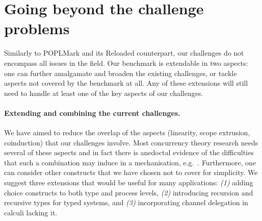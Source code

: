 \documentclass[runningheads]{llncs}
\begin{document}
\section{Going beyond the challenge problems}\label{sec:going-beyond}
Similarly to POPLMark and its Reloaded counterpart, our challenges do not encompass all issues in the field.
Our benchmark is extendable in two aspects: one can further amalgamate and broaden the existing challenges, or tackle aspects not covered by the benchmark at all.
Any of these extensions will still need to handle at least one of the key aspects of our challenges.

\paragraph{Extending and combining the current challenges.}
We have aimed to reduce the overlap of the aspects (linearity, scope
extrusion, coinduction) that our challenges involve.  Most concurrency
theory research needs several of these aspects and in fact there is
anedoctal evidence of the difficulties that such a combination may induce
in a mechanisation,
e.g.~\cite{DBLP:conf/forte/ZalakainD21}. Furthermore, one can consider
other constructs that we have chosen not to cover for simplicity.  We
suggest three extensions that would be useful for many applications:
\emph{(1)} adding choice constructs to both type and process levels,
\emph{(2)} introducing recursion and recursive types for typed
systems, and \emph{(3)} incorporating channel delegation in calculi
lacking it.

\end{document}
